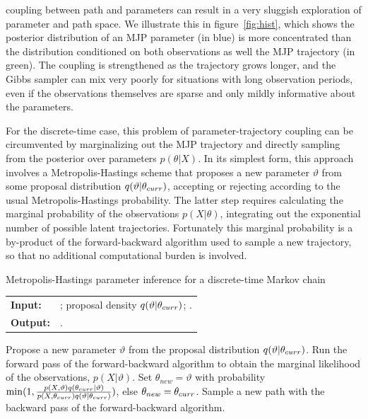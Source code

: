 coupling between path and parameters can result in a very sluggish
exploration of parameter and path space. We illustrate this in figure~\ref{fig:hist},
which shows the posterior distribution of an MJP parameter (in blue)
is more concentrated than the distribution conditioned on both observations 
as well the MJP trajectory (in green). 
The coupling is strengthened as the trajectory grows longer, and
the Gibbs sampler can mix very poorly for situations with
long observation periods, even if the observations themselves are
sparse and only mildly informative about the parameters.

For the discrete-time case, this problem of parameter-trajectory
coupling can be circumvented by marginalizing out the MJP trajectory 
and directly sampling from the posterior over parameters $p(\theta|X)$.
In its simplest form, this approach involves a Metropolis-Hastings
scheme that proposes a new parameter $\vartheta$ from some proposal distribution 
$q(\vartheta|\theta_{curr})$, accepting or rejecting according to the usual
Metropolis-Hastings probability. The latter step requires calculating the 
marginal probability of the observations $p(X|\theta)$, integrating out
the exponential number of possible latent trajectories. Fortunately
this marginal probability is a by-product of the forward-backward
algorithm used to sample a new trajectory, so that no 
additional computational burden is involved. 
\begin{algorithm}[H]
  \caption{Metropolis-Hastings parameter inference for a discrete-time 
Markov chain}
   \label{alg:disc_time_mh}
  \begin{tabular}{l l}
   \textbf{Input:  } & \text{Observations $X$};
   proposal density $q(\vartheta|\theta_{curr})$; 
   \text{previous parameters $\ctheta$}.\\
   \textbf{Output:  }& \text{A new Markov chain parameter $\ntheta$}.\\
   \hline
   \end{tabular}
   \begin{algorithmic}[1]
  \State Propose a new parameter $\vartheta$ from the proposal distribution
  $q(\vartheta|\theta_{curr})$.
  \State Run the forward pass of the forward-backward algorithm to 
    obtain the marginal likelihood of the observations, $p(X|\vartheta)$.
    \State Set $\theta_{new} = \vartheta$ with probability 
    $\min(1,\frac{p(X,\vartheta)q(\theta_{curr}|\vartheta)}{p(X,\theta_{curr})q(\vartheta|\theta_{curr})})$, else 
    $\theta_{new} = \theta_{curr}$.
  \State Sample a new path with
    the backward pass of the forward-backward algorithm.
\end{algorithmic}
\end{algorithm}


